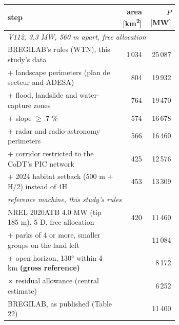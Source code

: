 \begin{tabular}{p{0.66\linewidth}rr}
\toprule
step & area [\si{\square\kilo\metre}] & $P$ [\si{\mega\watt}] \\
\midrule
\multicolumn{3}{l}{\emph{V112, 3.3 MW, 560 m apart, free allocation}} \\
BREGILAB's rules (WTN), this study's data & 1\,034 & 25\,087 \\
+ landscape perimeters (plan de secteur and ADESA) & 804 & 19\,932 \\
+ flood, landslide and water-capture zones & 764 & 19\,470 \\
+ slope $\geq$ 7 \% & 574 & 16\,678 \\
+ radar and radio-astronomy perimeters & 566 & 16\,460 \\
+ corridor restricted to the CoDT's PIC network & 425 & 12\,576 \\
+ 2024 habitat setback (500 m + H/2) instead of 4H & 453 & 13\,309 \\
\midrule
\multicolumn{3}{l}{\emph{reference machine, this study's rules}} \\
NREL 2020ATB 4.0 MW (tip 185 m), 5 D, free allocation & 420 & 11\,460 \\
+ parks of 4 or more, smaller groups on the land left &  & 11\,084 \\
+ open horizon, 130° within 4 km \textbf{(gross reference)} &  & 8\,172 \\
$\times$ residual allowance (central estimate) &  & 6\,252 \\
\midrule
BREGILAB, as published (Table 22) &  & 11\,400 \\
\bottomrule
\end{tabular}